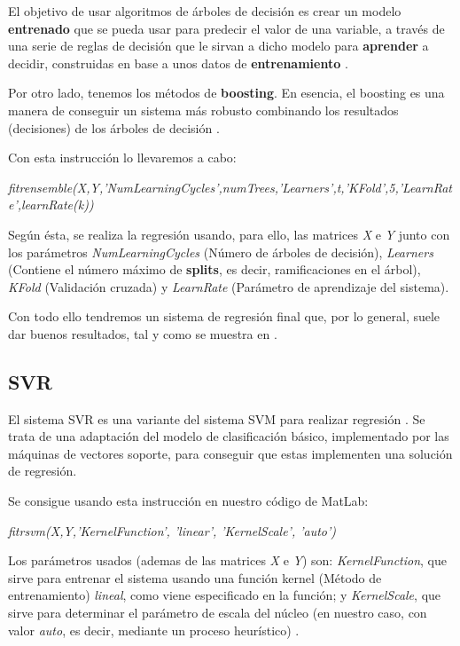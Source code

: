 El objetivo de usar algoritmos de árboles de decisión es crear un modelo \textbf{entrenado} que se pueda usar para predecir el valor de una variable, a través de una serie de reglas de decisión que le sirvan a dicho modelo para \textbf{aprender} a decidir, construidas en base a unos datos de \textbf{entrenamiento} \cite{decision-tree}.

Por otro lado, tenemos los métodos de \textbf{boosting}. En esencia, el boosting es una manera de conseguir un sistema más robusto combinando los resultados (decisiones) de los árboles de decisión \cite{boosting}.

Con esta instrucción lo llevaremos a cabo:

\begin{center}
\textit{fitrensemble(X,Y,'NumLearningCycles',numTrees,'Learners',t,'KFold',5,'LearnRate',learnRate(k))}
\end{center}

Según ésta, se realiza la regresión usando, para ello, las matrices \textit{X} e \textit{Y} junto con los parámetros \textit{NumLearningCycles} (Número de árboles de decisión), \textit{Learners} (Contiene el número máximo de \textbf{splits}, es decir, ramificaciones en el árbol), \textit{KFold} (Validación cruzada) y \textit{LearnRate} (Parámetro de aprendizaje del sistema)\cite{fitrensemble}.

Con todo ello tendremos un sistema de regresión final que, por lo general, suele dar buenos resultados, tal y como se muestra en \cite{isa2}.

\subsection{SVR}

El sistema \ac{SVR} es una variante del sistema \ac{SVM} para realizar regresión \cite{SVR}. Se trata de una adaptación del modelo de clasificación básico, implementado por las máquinas de vectores soporte, para conseguir que estas implementen una solución de regresión.

Se consigue usando esta instrucción en nuestro código de MatLab:

\begin{center}
\textit{fitrsvm(X,Y,'KernelFunction', 'linear', 'KernelScale', 'auto')}
\end{center}

Los parámetros usados (ademas de las matrices \textit{X} e \textit{Y}) son: \textit{KernelFunction}, que sirve para entrenar el sistema usando una función kernel (Método de entrenamiento) \textit{lineal}, como viene especificado en la función; y \textit{KernelScale}, que sirve para determinar el parámetro de escala del núcleo (en nuestro caso, con valor \textit{auto}, es decir, mediante un proceso heurístico) \cite{fitrsvm}.

